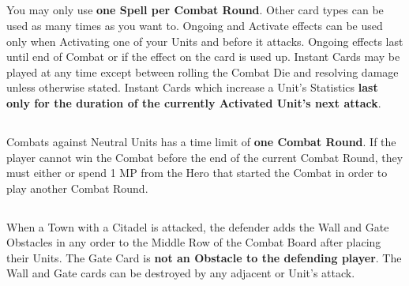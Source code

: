 \begin{multicols}{2}
\subsection*{}
You may only use \textbf{one Spell per Combat Round}.
Other card types can be used as many times as you want to.
Ongoing  and  Activate effects can be used only when Activating one of your Units and before it attacks.
Ongoing effects last until end of Combat or if the effect on the card is used up.
Instant  Cards may be played at any time except between rolling the Combat Die and resolving damage unless otherwise stated.
Instant Cards which increase a Unit's Statistics \textbf{last only for the duration of the currently Activated Unit's next attack}.
\subsection*{}
Combats against Neutral Units has a time limit of \textbf{one Combat Round}.
If the player cannot win the Combat before the end of the current Combat Round, they must either  or spend 1 MP from the Hero that started the Combat in order to play another Combat Round.\par
{}

\subsection*{}

When a Town with a Citadel is attacked, the defender adds the Wall and Gate Obstacles in any order to the Middle Row of the Combat Board after placing their Units.
The Gate Card is \textbf{not an Obstacle to the defending player}.
The Wall and Gate cards can be destroyed by any adjacent  or  Unit's attack.\par
{}\par


\end{multicols}
